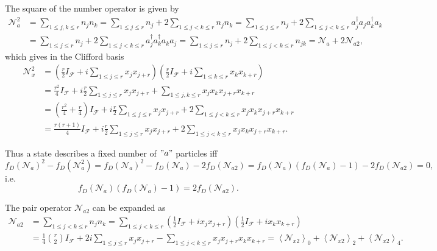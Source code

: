 \documentclass[aps,preprint]{revtex4}%
\begin{document}
The square of the number operator is given by
\begin{align}
\mathcal{N}_{a}^{2}  &  =\sum_{1\leq j,k\leq r}n_{j}n_{k}=\sum_{1\leq j\leq
r}n_{j}+2\sum_{1\leq j<k\leq r}n_{j}n_{k}=\sum_{1\leq j\leq r}n_{j}%
+2\sum_{1\leq j<k\leq r}a_{j}^{\dagger}a_{j}a_{k}^{\dagger}a_{k}\\
&  =\sum_{1\leq j\leq r}n_{j}+2\sum_{1\leq j<k\leq r}a_{j}^{\dagger}%
a_{k}^{\dagger}a_{k}a_{j}=\sum_{1\leq j\leq r}n_{j}+2\sum_{1\leq j<k\leq
r}n_{jk}=\mathcal{N}_{a}+2\mathcal{N}_{a2},
\end{align}
which gives in the Clifford basis
\begin{align}
\mathcal{N}_{x}^{2}  &  =\left(  \frac{r}{2}I_{\mathcal{F}}+i\sum_{1\leq j\leq
r}x_{j}x_{j+r}\right)  \left(  \frac{r}{2}I_{\mathcal{F}}+i\sum_{1\leq k\leq
r}x_{k}x_{k+r}\right) \nonumber\\
&  =\frac{r^{2}}{4}I_{\mathcal{F}}+i\frac{r}{2}\sum_{1\leq j\leq r}%
x_{j}x_{j+r}+\sum_{1\leq j,k\leq r}x_{j}x_{k}x_{j+r}x_{k+r}\nonumber\\
&  =\left(  \frac{r^{2}}{4}+\frac{r}{4}\right)  I_{\mathcal{F}}+i\frac{r}%
{2}\sum_{1\leq j\leq r}x_{j}x_{j+r}+2\sum_{1\leq j<k\leq r}x_{j}x_{k}%
x_{j+r}x_{k+r}\nonumber\\
&  =\frac{r\left(  r+1\right)  }{4}I_{\mathcal{F}}+i\frac{r}{2}\sum_{1\leq
j\leq r}x_{j}x_{j+r}+2\sum_{1\leq j<k\leq r}x_{j}x_{k}x_{j+r}x_{k+r}.
\end{align}


Thus a state describes a fixed number of $"a"$ particles iff
\begin{equation}
f_{D}\left(  \mathcal{N}_{a}\right)  ^{2}-f_{D}\left(  \mathcal{N}_{a}%
^{2}\right)  =f_{D}\left(  \mathcal{N}_{a}\right)  ^{2}-f_{D}\left(
\mathcal{N}_{a}\right)  -2f_{D}\left(  \mathcal{N}_{a2}\right)  =f_{D}\left(
\mathcal{N}_{a}\right)  \left(  f_{D}\left(  \mathcal{N}_{a}\right)
-1\right)  -2f_{D}\left(  \mathcal{N}_{a2}\right)  =0,
\end{equation}
i.e.
\begin{equation}
f_{D}\left(  \mathcal{N}_{a}\right)  \left(  f_{D}\left(  \mathcal{N}%
_{a}\right)  -1\right)  =2f_{D}\left(  \mathcal{N}_{a2}\right)  .
\end{equation}


The pair operator $\mathcal{N}_{a2}$ can be expanded as
\begin{align}
\mathcal{N}_{a2}  &  =\sum_{1\leq j<k\leq r}n_{j}n_{k}=\sum_{1\leq j<k\leq
r}\left(  \frac{1}{2}I_{\mathcal{F}}+ix_{j}x_{j+r}\right)  \left(  \frac{1}%
{2}I_{\mathcal{F}}+ix_{k}x_{k+r}\right) \\
&  =\frac{1}{4}\binom{r}{2}I_{\mathcal{F}}+2i\sum_{1\leq j\leq r}x_{j}%
x_{j+r}-\sum_{1\leq j<k\leq r}x_{j}x_{j+r}x_{k}x_{k+r}=\left\langle
\mathcal{N}_{x2}\right\rangle _{0}+\left\langle \mathcal{N}_{x2}\right\rangle
_{2}+\left\langle \mathcal{N}_{x2}\right\rangle _{4}.
\end{align}
\end{document}
